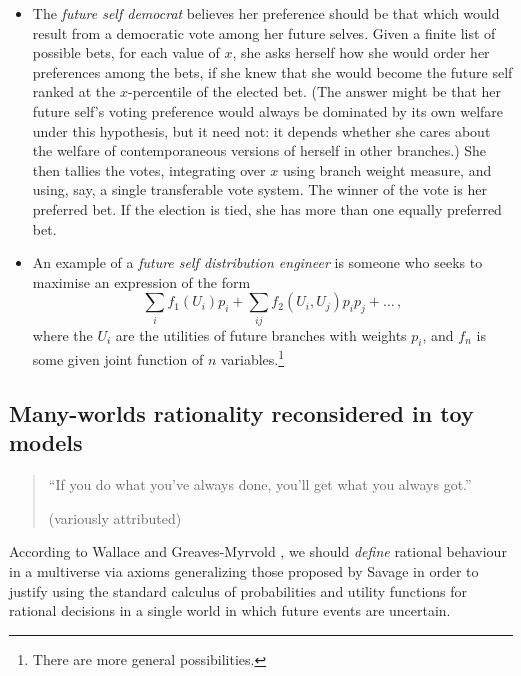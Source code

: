 \documentclass[aps,
pra,epsfig,12pt]{revtex4}
\begin{document}
\begin{itemize}
\item The {\it future self democrat} believes her preference should
be that which would result from a democratic vote among her future
selves.   Given a finite list of possible bets, for each value of 
$x$, she asks herself how she would order her preferences 
among the bets, if she knew that she would become the future self ranked at 
the $x$-percentile of the elected bet.  
(The answer might be that her future self's voting preference would always be 
dominated by its own welfare under this hypothesis, but it need not: 
it depends whether she cares about the welfare 
of contemporaneous versions of herself in other branches.) 
She then tallies the votes, integrating over $x$ using branch weight
measure, and using, say, a single transferable vote system.  
The winner of the vote
is her preferred bet.   If the election is tied, she has  
more than one equally preferred bet.   

\item An example of a {\it future self distribution engineer} 
is someone who seeks to maximise an expression of the form
\begin{equation}
\sum_i f_1 (U_i ) p_i + \sum_{ij} f_2 (U_i , U_j ) p_i p_j + \ldots \, , 
\end{equation}
where the $U_i$ are the utilities of future branches with weights $p_i$, 
and $f_n$ is some given joint function of $n$ 
variables.\footnote{There are more general possibilities.}

\end{itemize}

\subsection{Many-worlds rationality reconsidered in toy models} 

\begin{quotation}
``If you do what you've always done, you'll get what you always got.''

(variously attributed)
\end{quotation}



According to Wallace \cite{wallacevoltwo} and 
Greaves-Myrvold \cite{greavesmyrvoldvol}, we should 
{\it define} rational behaviour in a multiverse via axioms 
generalizing those proposed by Savage \cite{savage} in order
to justify using the standard calculus of probabilities and
utility functions for rational decisions in a single world
in which future events are uncertain.   
\end{document}
